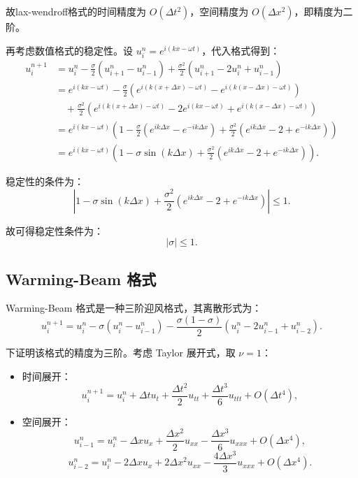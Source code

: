 \documentclass[12pt,a4paper]{article}
\begin{document}
故lax-wendroff格式的时间精度为 $O(\Delta t^2)$，空间精度为 $O(\Delta x^2)$，即精度为二阶。

再考虑数值格式的稳定性。设 $u_i^n = e^{i(kx - \omega t)}$，代入格式得到：
\[
\begin{aligned}
u_i^{n+1} &= u_i^n - \frac{\sigma}{2} \left( u_{i+1}^n - u_{i-1}^n \right) + \frac{\sigma^2}{2} \left( u_{i+1}^n - 2u_i^n + u_{i-1}^n \right) \\
&= e^{i(kx - \omega t)} - \frac{\sigma}{2} \left( e^{i(k(x + \Delta x) - \omega t)} - e^{i(k(x - \Delta x) - \omega t)} \right) \\
&\quad + \frac{\sigma^2}{2} \left( e^{i(k(x + \Delta x) - \omega t)} - 2e^{i(kx - \omega t)} + e^{i(k(x - \Delta x) - \omega t)} \right) \\
&= e^{i(kx - \omega t)} \left( 1 - \frac{\sigma}{2} (e^{ik\Delta x} - e^{-ik\Delta x}) + \frac{\sigma^2}{2} (e^{ik\Delta x} - 2 + e^{-ik\Delta x}) \right) \\
&= e^{i(kx - \omega t)} \left( 1 - \sigma \sin(k\Delta x) + \frac{\sigma^2}{2} (e^{ik\Delta x} - 2 + e^{-ik\Delta x}) \right).
\end{aligned}
\]

稳定性的条件为：
\[
\left| 1 - \sigma \sin(k\Delta x) + \frac{\sigma^2}{2} (e^{ik\Delta x} - 2 + e^{-ik\Delta x}) \right| \leq 1.
\]

故可得稳定性条件为：
\[
|\sigma| \leq 1.
\]



\subsection{Warming-Beam 格式}
Warming-Beam 格式是一种三阶迎风格式，其离散形式为：
\[
u_i^{n+1} = u_i^n - \sigma \left( u_i^n - u_{i-1}^n \right) - \frac{\sigma (1-\sigma)}{2} \left( u_i^n - 2u_{i-1}^n + u_{i-2}^n \right).
\]

下证明该格式的精度为三阶。考虑 Taylor 展开式，取 $\nu = 1$：

\begin{itemize}
    \item 时间展开：
    \[
    u_i^{n+1} = u_i^n + \Delta t u_t + \frac{\Delta t^2}{2} u_{tt} + \frac{\Delta t^3}{6} u_{ttt} + O(\Delta t^4),
    \]
    \item 空间展开：
    \[
    u_{i-1}^n = u_i^n - \Delta x u_x + \frac{\Delta x^2}{2} u_{xx} - \frac{\Delta x^3}{6} u_{xxx} + O(\Delta x^4),
    \]
    \[
    u_{i-2}^n = u_i^n - 2\Delta x u_x + 2\Delta x^2 u_{xx} - \frac{4\Delta x^3}{3} u_{xxx} + O(\Delta x^4).
    \]
\end{itemize}
\end{document}
